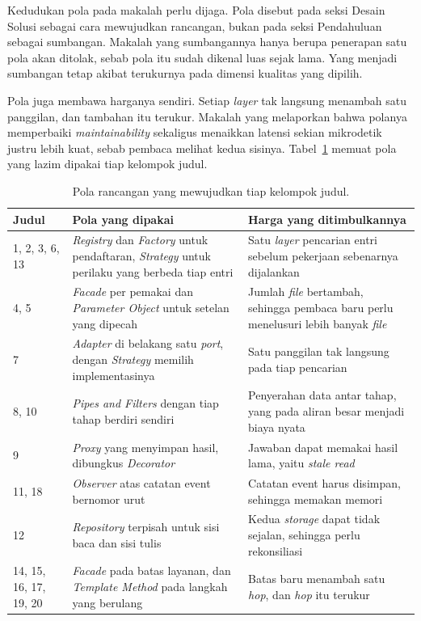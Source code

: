 Kedudukan pola pada makalah perlu dijaga. Pola disebut pada seksi Desain
Solusi sebagai cara mewujudkan rancangan, bukan pada seksi Pendahuluan sebagai
sumbangan. Makalah yang sumbangannya hanya berupa penerapan satu pola akan
ditolak, sebab pola itu sudah dikenal luas sejak lama. Yang menjadi sumbangan
tetap akibat terukurnya pada dimensi kualitas yang dipilih.

Pola juga membawa harganya sendiri. Setiap \textit{layer}
tak langsung menambah satu
panggilan, dan tambahan itu terukur. Makalah yang melaporkan bahwa polanya
memperbaiki \textit{maintainability} sekaligus menaikkan latensi sekian
mikrodetik justru lebih kuat, sebab pembaca melihat kedua sisinya.
Tabel~\ref{tab:pola} memuat pola yang lazim dipakai tiap kelompok judul.

\begin{table}[htbp]
  \centering
  \caption{Pola rancangan yang mewujudkan tiap kelompok judul.}
  \label{tab:pola}
  \begin{tabularx}{\textwidth}{|l|X|X|}
    \hline
    \textbf{Judul} & \textbf{Pola yang dipakai} & \textbf{Harga yang ditimbulkannya} \\
    \hline
    1, 2, 3, 6, 13 & \textit{Registry} dan \textit{Factory} untuk pendaftaran, \textit{Strategy} untuk perilaku yang berbeda tiap entri & Satu \textit{layer} pencarian entri sebelum pekerjaan sebenarnya dijalankan \\
    \hline
    4, 5 & \textit{Facade} per pemakai dan \textit{Parameter Object} untuk setelan yang dipecah & Jumlah \textit{file} bertambah, sehingga pembaca baru perlu menelusuri lebih banyak \textit{file} \\
    \hline
    7 & \textit{Adapter} di belakang satu \textit{port}, dengan \textit{Strategy} memilih implementasinya & Satu panggilan tak langsung pada tiap pencarian \\
    \hline
    8, 10 & \textit{Pipes and Filters} dengan tiap tahap berdiri sendiri & Penyerahan data antar tahap, yang pada aliran besar menjadi biaya nyata \\
    \hline
    9 & \textit{Proxy} yang menyimpan hasil, dibungkus \textit{Decorator} & Jawaban dapat memakai hasil lama, yaitu \textit{stale read} \\
    \hline
    11, 18 & \textit{Observer} atas catatan event bernomor urut & Catatan event harus disimpan, sehingga memakan memori \\
    \hline
    12 & \textit{Repository} terpisah untuk sisi baca dan sisi tulis & Kedua \textit{storage} dapat tidak sejalan, sehingga perlu rekonsiliasi \\
    \hline
    14, 15, 16, 17, 19, 20 & \textit{Facade} pada batas layanan, dan \textit{Template Method} pada langkah yang berulang & Batas baru menambah satu \textit{hop}, dan \textit{hop} itu terukur \\
    \hline
  \end{tabularx}
\end{table}

